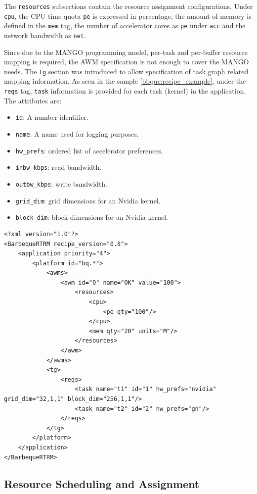 The \texttt{resources} subsections contain the resource assignment configurations. Under \texttt{cpu}, the CPU time quota \texttt{pe} is expressed in percentage, the amount of memory is defined in the \texttt{mem} tag, the number of accelerator cores as \texttt{pe} under \texttt{acc} and the network bandwidth as \texttt{net}.

Since due to the MANGO programming model, per-task and per-buffer resource mapping is required, the AWM specification is not enough to cover the MANGO needs. The \texttt{tg} section was introduced to allow specification of task graph related mapping information.
As seen in the sample \ref{bbque:recipe_example}, under the \texttt{reqs} tag, \texttt{task} information is provided for each task (kernel) in the application. The attributes are:

\begin{itemize}
    \item \texttt{id}: A number identifier.
    \item \texttt{name}: A name used for logging purposes.
    \item \texttt{hw\_prefs}: ordered list of accelerator preferences.
    \item \texttt{inbw\_kbps}: read bandwidth.
    \item \texttt{outbw\_kbps}: write bandwidth.
    \item \texttt{grid\_dim}: grid dimensions for an Nvidia kernel.
    \item \texttt{block\_dim}: block dimensions for an Nvidia kernel.
\end{itemize}

\begin{lstlisting}[style=CStyle, label=bbque:recipe_example, caption=BarbecueRTRM Recipe file - Saxpy Sample in GN and Nvidia]
<?xml version="1.0"?>
<BarbequeRTRM recipe_version="0.8">
	<application priority="4">
		<platform id="bq.*">
			<awms>
				<awm id="0" name="OK" value="100">
					<resources>
						<cpu>
							<pe qty="100"/>
						</cpu>
						<mem qty="20" units="M"/>
					</resources>
				</awm>
			</awms>
			<tg>
				<reqs>
					<task name="t1" id="1" hw_prefs="nvidia" grid_dim="32,1,1" block_dim="256,1,1"/>
					<task name="t2" id="2" hw_prefs="gn"/>
				</reqs>
			</tg>
		</platform>
	</application>
</BarbequeRTRM>
\end{lstlisting}

\subsection{Resource Scheduling and Assignment}

